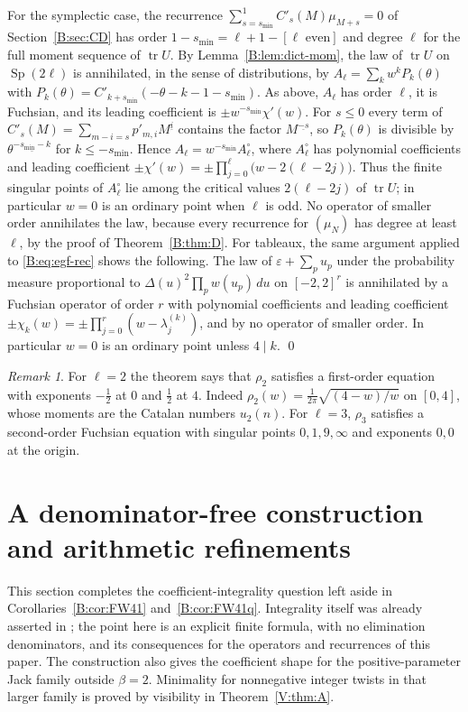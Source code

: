 \documentclass[11pt,a4paper]{article}
\theoremstyle{definition}
\theoremstyle{remark}
\newtheorem{remark}[theorem]{Remark}
\newcommand{\ff}[2]{#1^{\underline{#2}}}
\DeclareMathOperator{\tr}{tr}
\DeclareMathOperator{\Sp}{Sp}
\numberwithin{equation}{section}
\begin{document}
For the symplectic case, the recurrence $\sum_{s=s_{\min}}^{1}C'_s(M)\mu_{M+s}=0$ of Section~\ref{B:sec:CD} has order $1-s_{\min}=\ell+1-[\ell\text{ even}]$ and degree $\ell$ for the full moment sequence of $\tr U$. By Lemma~\ref{B:lem:dict-mom}, the law of $\tr U$ on $\Sp(2\ell)$ is annihilated, in the sense of distributions, by $A_\ell=\sum_kw^kP_k(\theta)$ with $P_k(\theta)=C'_{k+s_{\min}}(-\theta-k-1-s_{\min})$. As above, $A_\ell$ has order $\ell$, it is Fuchsian, and its leading coefficient is $\pm w^{-s_{\min}}\chi'(w)$. For $s\le0$ every term of $C'_s(M)=\sum_{m-i=s}p'_{m,i}\ff{M}{i}$ contains the factor $\ff{M}{-s}$, so $P_k(\theta)$ is divisible by $\ff{\theta}{-s_{\min}-k}$ for $k\le-s_{\min}$. Hence $A_\ell=w^{-s_{\min}}A^\circ_\ell$, where $A^\circ_\ell$ has polynomial coefficients and leading coefficient $\pm\chi'(w)=\pm\prod_{j=0}^{\ell}\bigl(w-2(\ell-2j)\bigr)$. Thus the finite singular points of $A^\circ_\ell$ lie among the critical values $2(\ell-2j)$ of $\tr U$; in particular $w=0$ is an ordinary point when $\ell$ is odd. No operator of smaller order annihilates the law, because every recurrence for $(\mu_N)$ has degree at least $\ell$, by the proof of Theorem~\ref{B:thm:D}. For tableaux, the same argument applied to \eqref{B:eq:egf-rec} shows the following. The law of $\varepsilon+\sum_pu_p$ under the probability measure proportional to $\Delta(u)^2\prod_pw(u_p)\,du$ on $[-2,2]^r$ is annihilated by a Fuchsian operator of order $r$ with polynomial coefficients and leading coefficient $\pm\chi_k(w)=\pm\prod_{j=0}^{r}(w-\lambda^{(k)}_j)$, and by no operator of smaller order. In particular $w=0$ is an ordinary point unless $4\mid k$. \qed

\begin{remark}
For $\ell=2$ the theorem says that $\rho_2$ satisfies a first-order equation with exponents $-\frac12$ at $0$ and $\frac12$ at $4$. Indeed $\rho_2(w)=\frac1{2\pi}\sqrt{(4-w)/w}$ on $[0,4]$, whose moments are the Catalan numbers $u_2(n)$. For $\ell=3$, $\rho_3$ satisfies a second-order Fuchsian equation with singular points $0,1,9,\infty$ and exponents $0,0$ at the origin.
\end{remark}

\section{A denominator-free construction and arithmetic refinements}
\label{B:sec:integral-continuant}

This section completes the coefficient-integrality question left aside in
Corollaries~\ref{B:cor:FW41} and~\ref{B:cor:FW41q}.  Integrality itself was already
asserted in \cite[Proposition~4.1]{FW26}; the point here is an explicit finite
formula, with no elimination denominators, and its consequences for the
operators and recurrences of this paper.  The construction also gives the
coefficient shape for the positive-parameter Jack family outside $\beta=2$.
Minimality for nonnegative integer twists in that larger family is proved by visibility in Theorem~\ref{V:thm:A}.
\end{document}
